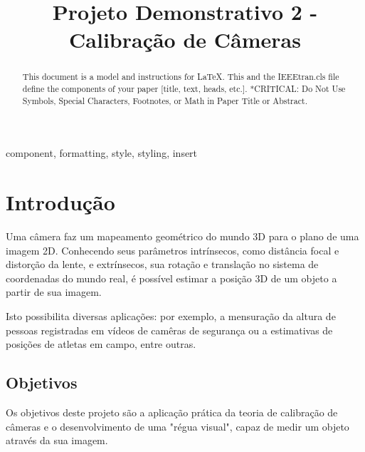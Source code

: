 \documentclass[conference]{IEEEtran}
\begin{document}
\title{Projeto Demonstrativo 2 - Calibração de Câmeras}

\author{
}

\maketitle

\begin{abstract}
This document is a model and instructions for \LaTeX.
This and the IEEEtran.cls file define the components of your paper [title, text, heads, etc.]. *CRITICAL: Do Not Use Symbols, Special Characters, Footnotes, 
or Math in Paper Title or Abstract.
\end{abstract}

\begin{IEEEkeywords}
component, formatting, style, styling, insert
\end{IEEEkeywords}

\section{Introdução}
Uma câmera faz um mapeamento geométrico do mundo 3D para o plano de uma imagem 2D. Conhecendo seus parâmetros intrínsecos, como distância focal e distorção da lente, e extrínsecos, sua rotação e translação no sistema de coordenadas do mundo real, é possível estimar a posição 3D de um objeto a partir de sua imagem\cite{tese}. 

Isto possibilita diversas aplicações: por exemplo, a mensuração da altura de pessoas registradas em vídeos de camêras de segurança ou a estimativas de posições de atletas em campo, entre outras.

\subsection{Objetivos}
Os objetivos deste projeto são a aplicação prática da teoria de calibração de câmeras e o desenvolvimento de uma "régua visual", capaz de medir um objeto através da sua imagem.
\end{document}
